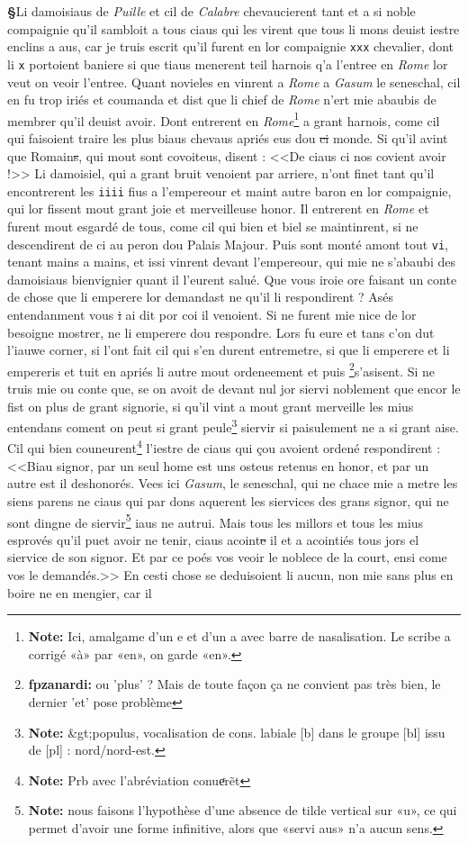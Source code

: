 \documentclass[12pt]{article} %
\newcommand{\colmar}[1]{\marginnote{[#1]}}          %
\newcommand{\persName}[1]{\emph{#1}} %
\newcommand{\placeName}[1]{\emph{#1}} %
\newcommand{\num}[1]{\texttt{#1}}    %
\newcommand{\supplied}[1]{\textlangle#1\textrangle} %
\newcommand{\fnnote}[1]{\footnote{\textbf{Note:} #1}} %
\newcommand{\fnfpz}[1]{\footnote{\textbf{fpzanardi:} #1}} %
\newcommand{\del}[1]{\sout{#1}}      %
\newcounter{paranum}
\newcommand{\pnum}{\stepcounter{paranum}\textbf{§\arabic{paranum}}\quad}
\begin{document}
\pnum Li damoisiaus de \placeName{Puille} et cil de \placeName{Calabre} chevaucierent tant et a si noble compaignie qu'il sambloit a tous ciaus qui les virent que tous li mons deuist iestre enclins a aus, car je truis escrit qu'il furent en lor compaignie \num{xxx} chevalier, dont li \num{x} portoient baniere si que tiaus menerent teil harnois q'a l'entree en \placeName{Rome} lor veut on veoir l'entree. Quant novieles en vinrent a \placeName{Rome} a \persName{Gasum} le seneschal, \colmar{5vb}\colmar{b} cil en fu trop iriés et coumanda et dist que li chief de \placeName{Rome} n'ert mie abaubis de membrer qu'il deuist avoir. Dont entrerent en \placeName{Rome}\fnnote{Ici, amalgame d'un e et d'un a avec barre de nasalisation. Le scribe a corrigé «à» par «en», on garde «en».} a grant harnois, come cil qui faisoient traire les plus biaus chevaus apriés eus dou \del{ci} monde. Si qu'il avint que Romain\del{s}, qui mout sont covoiteus, disent : <<De ciaus ci nos covient avoir !>> Li damoisiel, qui a grant bruit venoient par arriere, n'ont finet tant qu'il encontrerent les \num{iiii} fius a l'empereour et maint autre baron en lor compaignie, qui lor fissent mout grant joie et merveilleuse honor. Il entrerent en \placeName{Rome} et furent mout esgardé de tous, come cil qui bien et biel se maintinrent, si ne descendirent de ci au peron dou Palais Majour. Puis sont monté amont tout \num{vi}, tenant mains a mains, et issi vinrent devant l'empereour, qui mie ne s'abaubi des damoisiaus bienvignier quant il l'eurent salué. Que vous iroie ore faisant un conte de chose que li emperere lor demandast ne qu'il li respondirent ? Asés entendanment vous \del{i} ai dit por coi il venoient. Si ne furent mie nice de lor besoigne mostrer, ne li emperere dou respondre. Lors fu eure et tans c'on dut l'iauwe corner, si l'ont fait cil qui s'en durent entremetre, si que li emperere et li empereris et tuit en apriés li autre mout ordeneement et puis \fnfpz{ou 'plus' ? Mais de toute façon ça ne convient pas très bien, le dernier 'et' pose problème}s'asisent. Si ne truis mie ou conte que, se on avoit de devant nul jor siervi noblement que encor le fist on plus de grant signorie, si qu'il vint a mout grant merveille les mius entendans coment on peut si grant peule\fnnote{&gt;populus, vocalisation de cons. labiale [b] dans le groupe [bl] issu de [pl] : nord/nord-est.} siervir si paisulement ne a si grant aise. Cil qui b\supplied{ie}n couneurent\fnnote{Prb avec l'abréviation conueͬrẽt} l'iestre de ciaus qui çou avoie\supplied{n}t ordené respondirent : <<Biau signor, par un seul home est uns osteus retenus en honor, et par un autre est il deshonorés. Vees ici \persName{Gasum}, le seneschal, qui ne chace mie a metre les siens parens ne ciaus qui par dons aquerent les siervices des grans signor, qui ne sont dingne de sierv\supplied{ir}\fnnote{nous faisons l'hypothèse d'une absence de tilde vertical sur «u», ce qui permet d'avoir une forme infinitive, alors que «servi aus» n'a aucun sens.} iaus ne autrui. Mais tous les millors et tous les mius esprovés qu'il puet avoir ne tenir, ciaus acoint\del{e} il et a acointiés tous jors el siervice de son signor. Et par ce poés vos veoir le noblece de la court, ensi come vos le demandés.>> En cesti chose se deduisoient li aucun, non mie sans plus en boire ne en mengier, car il 
\end{document}
